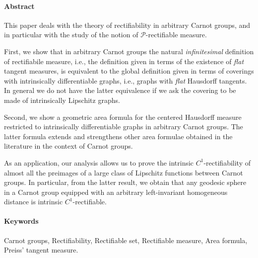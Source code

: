 \documentclass[10pt, a4paper,
oneside, headinclude,footinclude]{scrartcl}
\title{\normalfont\spacedallcaps{On rectifiable measures in Carnot groups: representation}}
\author{\spacedlowsmallcaps{Gioacchino Antonelli\textsuperscript{*} and Andrea Merlo\textsuperscript{**}}}
\date{}
\begin{document}
\renewcommand{\sectionmark}[1]{\markright{\spacedlowsmallcaps{#1}}} 
\lehead{\mbox{\llap{\small\thepage\kern1em\color{halfgray} \vline}\color{halfgray}\hspace{0.5em}\rightmark\hfil}} 
\pagestyle{scrheadings}
\maketitle 
\setcounter{tocdepth}{2}
\paragraph*{Abstract}
This paper deals with the theory of rectifiability in arbitrary Carnot groups, and in particular with the study of the notion of $\mathscr{P}$-rectifiable measure. 

First, we show that in arbitrary Carnot groups the natural \textit{infinitesimal} definition of rectifiabile measure, i.e., the definition given in terms of the existence of \textit{flat} tangent measures, is equivalent to the global definition given in terms of coverings with intrinsically differentiable graphs, i.e., graphs with \textit{flat} Hausdorff tangents. In general we do not have the latter equivalence if we ask the covering to be made of intrinsically Lipschitz graphs.

Second, we show a geometric area formula for the centered Hausdorff measure restricted to intrinsically differentiable graphs in arbitrary Carnot groups. The latter formula extends and strengthens other area formulae obtained in the literature in the context of Carnot groups.

As an application, our analysis allows us to prove the intrinsic $C^1$-rectifiability of almost all the preimages of a large class of Lipschitz functions between Carnot groups. In particular, from the latter result, we obtain that any geodesic sphere in a Carnot group equipped with an arbitrary left-invariant homogeneous distance is intrinsic $C^1$-rectifiable.
{\let\thefootnote\relax{}}
{\let\thefootnote\relax{}}



\paragraph*{Keywords} Carnot groups, Rectifiability, Rectifiable set, Rectifiable measure, Area formula, Preiss' tangent measure.
\end{document}
